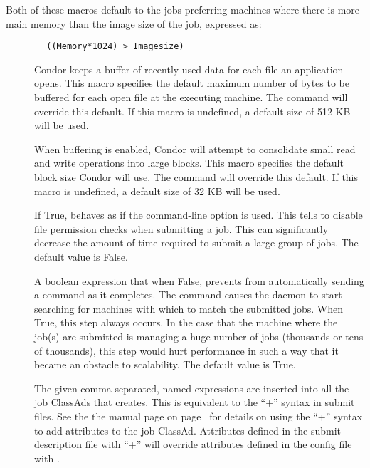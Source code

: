 Both of these macros default to the jobs preferring machines where
there is more main memory than the image size of the job, expressed
as:
\begin{verbatim}
        ((Memory*1024) > Imagesize)
\end{verbatim}

\begin{description}
\item[] \label{param:DefaultBufferSize}
  Condor keeps a buffer of recently-used data for each file an
  application opens.  This macro specifies the default maximum number
  of bytes to be buffered for each open file at the executing machine.
  The   command will override this
  default.  If this macro is undefined, a default size of 512 KB will
  be used.

\item[] 
  \label{param:DefaultBufferBlockSize} When buffering is enabled,
  Condor will attempt to consolidate small read and write operations
  into large blocks.  This macro specifies the default block size
  Condor will use.  The  
  command will override this default.  If this macro is undefined, a
  default size of 32 KB will be used.

\item[] \label{param:SubmitSkipFilecheck}
  If True,  behaves as if the  
  command-line option is used.
  This tells  to disable file permission checks when
  submitting a job.
  This can significantly decrease the amount of time required to submit
  a large group of jobs.
  The default value is False.

\item[] \label{param:SubmitSendReschedule}
  A boolean expression that when False, prevents  from
  automatically sending a  command as it completes.
  The  command causes the  daemon
  to start searching for machines with which to match the submitted
  jobs.  When True, this step always occurs.
  In the case that the machine where the job(s) are submitted is
  managing a huge number of jobs (thousands or tens of thousands),
  this step would hurt performance in such a way that it became
  an obstacle to scalability.
  The default value is True.

\item[] \label{param:SubmitExprs}
  The given comma-separated, named expressions are inserted into all 
  the job ClassAds that  creates.  This is equivalent
  to the ``+'' syntax in submit files.  See the
  the  manual page
  on page~\pageref{man-condor-submit} for details on using the ``+''
  syntax to add attributes to the job ClassAd.
  Attributes defined in the submit description file with ``+'' will
  override attributes defined in the config file with
  . 


\end{description}

